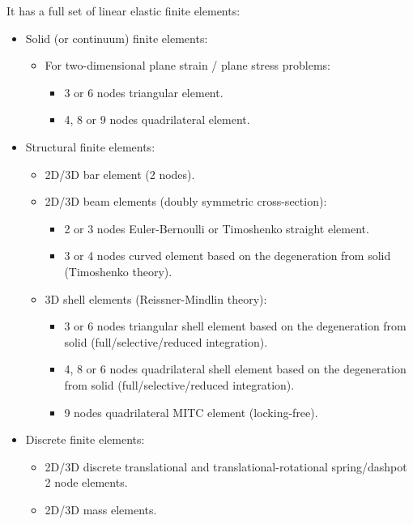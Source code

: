 \documentclass[a4paper,fleqn]{book}
\begin{document}
It has a full set of linear elastic finite elements: 
\begin{itemize}
    \item Solid (or continuum) finite elements:
    \begin{itemize}
        \item For two-dimensional plane strain / plane stress problems:
        \begin{itemize}
            \item 3 or 6 nodes triangular element.
            \item 4, 8 or 9 nodes quadrilateral element.
        \end{itemize}
    \end{itemize}
    \item Structural finite elements:
    \begin{itemize}
        \item 2D/3D bar element (2 nodes).
        \item 2D/3D beam elements (doubly symmetric cross-section):
        \begin{itemize}
            \item 2 or 3 nodes Euler-Bernoulli or Timoshenko straight element.
            \item 3 or 4 nodes curved element based on the degeneration from solid (Timoshenko theory).
        \end{itemize}
        \item 3D shell elements (Reissner-Mindlin theory):
        \begin{itemize}
            \item 3 or 6 nodes triangular shell element based on the degeneration from solid (full/selective/reduced integration).
            \item 4, 8 or 6 nodes quadrilateral shell element based on the degeneration from solid (full/selective/reduced integration).
            \item 9 nodes quadrilateral MITC element (locking-free).
        \end{itemize}
    \end{itemize}
    \item Discrete finite elements:
    \begin{itemize}
        \item 2D/3D discrete translational and translational-rotational spring/dashpot 2 node elements.
        \item 2D/3D mass elements.
    \end{itemize}
\end{itemize}
\end{document}
